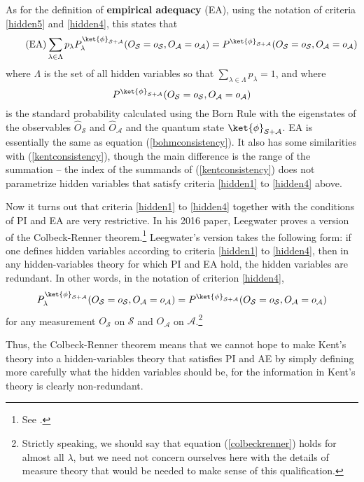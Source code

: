 As for the definition of \textbf{empirical adequacy} (EA), using the notation of criteria \ref{hidden5} and \ref{hidden4}, this states that
\begin{equation}\tag{EA}\label{adeq}
	\sum_{\lambda\in\Lambda}p_\lambda P_\lambda^{\ket{\phi}_{\mathcal{S}+\mathcal{A}}}(O_\mathcal{S}=o_\mathcal{S},O_\mathcal{A}=o_\mathcal{A})=P^{\ket{\phi}_{\mathcal{S}+\mathcal{A}}}(O_\mathcal{S}=o_\mathcal{S},O_\mathcal{A}=o_\mathcal{A})
\end{equation}
where $\Lambda$ is the set of all hidden variables so that $\sum_{\lambda\in\Lambda} p_\lambda = 1$, and where 
$$P^{\ket{\phi}_{\mathcal{S}+\mathcal{A}}}(O_\mathcal{S}=o_\mathcal{S},O_\mathcal{A}=o_\mathcal{A})$$
 is the standard probability calculated using the Born Rule with the eigenstates of the observables $\hat{O}_\mathcal{S}$ and $\hat{O}_\mathcal{A}$ and the quantum state $\ket{\phi}_{\mathcal{S}+\mathcal{A}}$. EA is essentially the same as equation (\ref{bohmconsistency}). It also has some similarities with (\ref{kentconsistency}), though the main difference is the range of the summation -- the index of the summands of (\ref{kentconsistency}) does not parametrize hidden variables that satisfy criteria \ref{hidden1} to \ref{hidden4} above.

Now it turns out that criteria \ref{hidden1} to \ref{hidden4} together with the conditions of PI and EA are very restrictive. In his 2016 paper, Leegwater proves a version of the Colbeck-Renner theorem.\footnote{See \cite{LeegwaterGijs2016Aitf}.} Leegwater's version takes the following form: if one defines hidden variables according to criteria \ref{hidden1} to \ref{hidden4}, then in any hidden-variables theory for which PI and EA hold, the hidden variables are redundant. In other words, in the notation of criterion \ref{hidden4},
\begin{equation}\label{colbeckrenner}
P_\lambda^{\ket{\phi}_{\mathcal{S}+\mathcal{A}}}(O_\mathcal{S}=o_\mathcal{S},O_\mathcal{A}=o_\mathcal{A})=P^{\ket{\phi}_{\mathcal{S}+\mathcal{A}}}(O_\mathcal{S}=o_\mathcal{S},O_\mathcal{A}=o_\mathcal{A})
\end{equation}
for any measurement $O_\mathcal{S}$ on $\mathcal{S}$ and $O_\mathcal{A}$ on $\mathcal{A}$.\footnote{Strictly speaking, we should say that equation (\ref{colbeckrenner}) holds for almost all $\lambda$, but we need not concern ourselves here with the details of measure theory that would be needed to make sense of this qualification.} 

Thus, the Colbeck-Renner theorem means that we cannot hope to make Kent's theory into a hidden-variables theory that satisfies PI and AE by simply defining more carefully what the hidden variables should be, for the information in Kent's theory is clearly non-redundant.

